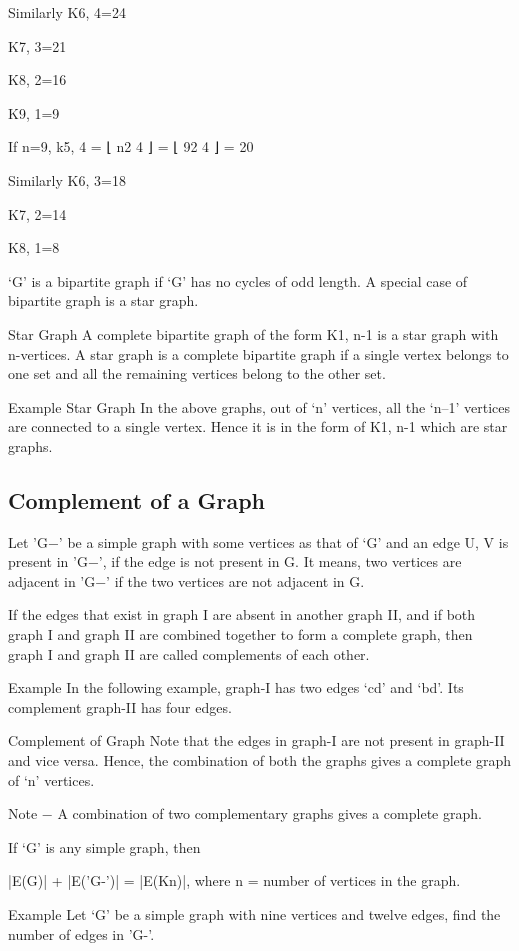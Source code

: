 Similarly K6, 4=24

K7, 3=21

K8, 2=16

K9, 1=9

If n=9, k5, 4 = ⌊
n2
4
⌋ = ⌊
92
4
⌋ = 20

Similarly K6, 3=18

K7, 2=14

K8, 1=8

‘G’ is a bipartite graph if ‘G’ has no cycles of odd length. A special case of bipartite graph is a star graph.

Star Graph
A complete bipartite graph of the form K1, n-1 is a star graph with n-vertices. A star graph is a complete bipartite graph if a single vertex belongs to one set and all the remaining vertices belong to the other set.

Example
Star Graph
In the above graphs, out of ‘n’ vertices, all the ‘n–1’ vertices are connected to a single vertex. Hence it is in the form of K1, n-1 which are star graphs.

\subsection{Complement of a Graph}
Let 'G−' be a simple graph with some vertices as that of ‘G’ and an edge {U, V} is present in 'G−', if the edge is not present in G. It means, two vertices are adjacent in 'G−' if the two vertices are not adjacent in G.

If the edges that exist in graph I are absent in another graph II, and if both graph I and graph II are combined together to form a complete graph, then graph I and graph II are called complements of each other.

Example
In the following example, graph-I has two edges ‘cd’ and ‘bd’. Its complement graph-II has four edges.

Complement of Graph
Note that the edges in graph-I are not present in graph-II and vice versa. Hence, the combination of both the graphs gives a complete graph of ‘n’ vertices.

Note − A combination of two complementary graphs gives a complete graph.

If ‘G’ is any simple graph, then

|E(G)| + |E('G-')| = |E(Kn)|, where n = number of vertices in the graph.

Example
Let ‘G’ be a simple graph with nine vertices and twelve edges, find the number of edges in 'G-'.

